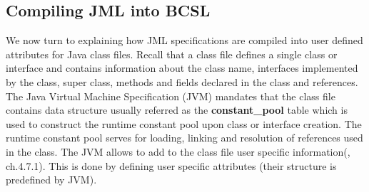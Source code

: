 


\subsection{Compiling JML into BCSL}\label{comJML}


We now turn to explaining how JML specifications are compiled into user defined attributes for Java class files. Recall that a class file defines
a single class or interface and contains information about  the class name, interfaces implemented by the class, super class, methods and fields declared in the class and references. The Java Virtual Machine Specification (JVM) \cite{VMSpec} mandates that the class file contains data structure usually referred as the \textbf{constant\_pool} table which is used to construct the runtime constant pool upon class or interface creation. The runtime constant pool serves for loading, linking and resolution of references used in the class. The JVM allows to add to the class file user specific information(\cite{VMSpec}, ch.4.7.1). This is done by defining user specific attributes  (their structure is predefined by JVM).


